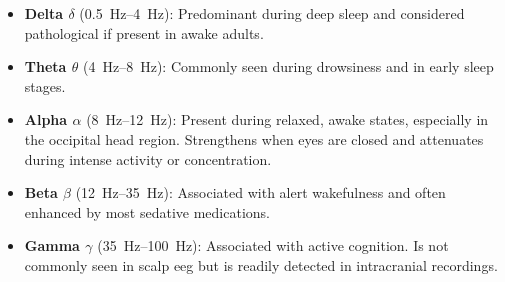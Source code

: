 {
\begin{itemize}
    \item \textbf{Delta $\delta$} (\SIrange{0.5}{4}{\hertz}): Predominant during deep sleep and considered pathological if present in awake adults.
    \item \textbf{Theta $\theta$} (\SIrange{4}{8}{\hertz}): Commonly seen during drowsiness and in early sleep stages.
    \item \textbf{Alpha $\alpha$} (\SIrange{8}{12}{\hertz}): Present during relaxed, awake states, especially in the occipital head region. Strengthens when eyes are closed and attenuates during intense activity or concentration.
    \item \textbf{Beta $\beta$} (\SIrange{12}{35}{\hertz}): Associated with alert wakefulness and often enhanced by most sedative medications.
    \item \textbf{Gamma $\gamma$} (\SIrange{35}{100}{\hertz}): Associated with active cognition. Is not commonly seen in scalp \gls{eeg} but is readily detected in intracranial recordings.
\end{itemize}
}


